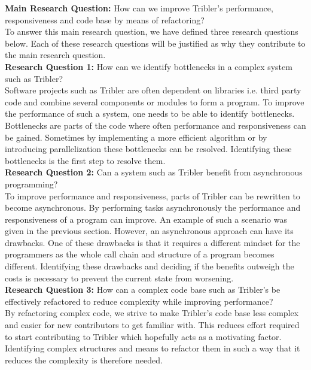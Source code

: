 \textbf{Main Research Question:} How can we improve Tribler's performance, responsiveness and code base by means of refactoring?\\

To answer this main research question, we have defined three research questions below. Each of these research questions will be justified as why they contribute to the main research question.\\

\textbf{Research Question 1:} How can we identify bottlenecks in a complex system such as Tribler?\\

Software projects such as Tribler are often dependent on libraries i.e. third party code and combine several components or modules to form a program.
To improve the performance of such a system, one needs to be able to identify bottlenecks.
Bottlenecks are parts of the code where often performance and responsiveness can be gained.
Sometimes by implementing a more efficient algorithm or by introducing parallelization these bottlenecks can be resolved.
Identifying these bottlenecks is the first step to resolve them.\\

\textbf{Research Question 2:} Can a system such as Tribler benefit from asynchronous programming?\\

To improve performance and responsiveness, parts of Tribler can be rewritten to become asynchronous.
By performing tasks asynchronously the performance and responsiveness of a program can improve. 
An example of such a scenario was given in the previous section.
However, an asynchronous approach can have its drawbacks. 
One of these drawbacks is that it requires a different mindset for the programmers as the whole call chain and structure of a program becomes different.
Identifying these drawbacks and deciding if the benefits outweigh the costs is necessary to prevent the current state from worsening. \\

\noindent
\textbf{Research Question 3:} How can a complex code base such as Tribler's be effectively refactored to reduce complexity while improving performance?\\

By refactoring complex code, we strive to make Tribler's code base less complex and easier for new contributors to get familiar with.
This reduces effort required to start contributing to Tribler which hopefully acts as a motivating factor.
Identifying complex structures and means to refactor them in such a way that it reduces the complexity is therefore needed.

